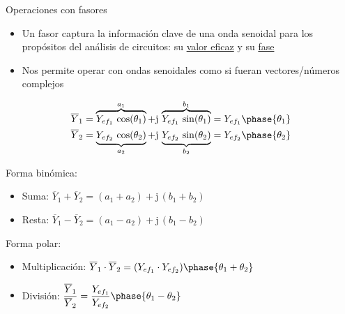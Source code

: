 \documentclass[aspectratio=169, usenames,svgnames,dvipsnames]{beamer}
\begin{document}
\begin{frame}{Operaciones con fasores}
    \begin{itemize}       
        \item Un fasor \alert{captura la información clave de una onda senoidal} para los propósitos del análisis de circuitos: su \underline{valor eficaz} y su \underline{fase} 

        \vspace{1mm}
        \item Nos permite \alert{operar con ondas senoidales como si fueran vectores/números complejos}
    \end{itemize}     
    \vspace*{-7mm}
    \begin{align*}
        \overline{Y}_1&=\overbrace{Y_{ef_1}\,\cos(\theta_1)}^{a_1}+\mathrm{j}\,\overbrace{Y_{ef_1}\,\sin(\theta_1)}^{b_1}=Y_{ef_1}\phase{\theta_1}\\
        \overline{Y}_2&=\underbrace{Y_{ef_2}\,\cos(\theta_2)}_{a_2}+\mathrm{j}\,\underbrace{Y_{ef_2}\,\sin(\theta_2)}_{b_2}=Y_{ef_2}\phase{\theta_2}
    \end{align*}
    
    \vspace*{-6mm}
    Forma binómica:

    \vspace*{-1mm}
    \begin{itemize}
        \item Suma: $\overline{Y}_1+\overline{Y}_2=(a_1+a_2)+\mathrm{j}\,(b_1+b_2)$

        \vspace{2mm}
        \item Resta: $\overline{Y}_1-\overline{Y}_2=(a_1-a_2)+\mathrm{j}\,(b_1-b_2)$
    \end{itemize}
    Forma polar:
    \begin{itemize}
        \item Multiplicación: $\overline{Y}_1\cdot \overline{Y}_2=(Y_{ef_1}\cdot Y_{ef_2})\phase{\theta_1+\theta_2}$
        \item División: $\dfrac{\overline{Y}_1}{\overline{Y}_2}=\dfrac{Y_{ef_1}}{Y_{ef_2}}\phase{\theta_1-\theta_2}$
    \end{itemize}    
\end{frame}

\end{document}
